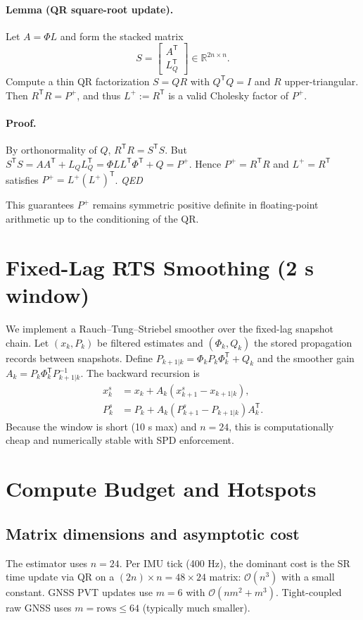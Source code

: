 \documentclass[10pt]{article}
\newcommand{\R}{\mathbb{R}}
\newcommand{\trans}{^{\mathsf T}}
\newcommand{\defeq}{\mathrel{:=}}
\begin{document}
\paragraph{Lemma (QR square-root update).}
Let $A=\Phi L$ and form the stacked matrix
\begin{equation}
  S = \begin{bmatrix} A\trans \\ L_Q\trans \end{bmatrix}\in \R^{2n\times n}.
\end{equation}
Compute a thin QR factorization $S = QR$ with $Q\trans Q = I$ and $R$ upper-triangular.
Then $R\trans R = P^+$, and thus $L^+ \defeq R\trans$ is a valid Cholesky factor of $P^+$.

\paragraph{Proof.}
By orthonormality of $Q$, $R\trans R = S\trans S$.
But $S\trans S = A A\trans + L_Q L_Q\trans = \Phi L L\trans \Phi\trans + Q = P^+$.
Hence $P^+ = R\trans R$ and $L^+=R\trans$ satisfies $P^+=L^+ (L^+)\trans$. \hfill\textit{QED}

This guarantees $P^+$ remains symmetric positive definite in floating-point arithmetic up to the conditioning of the QR.

\section{Fixed-Lag RTS Smoothing (2 s window)}
We implement a Rauch--Tung--Striebel smoother over the fixed-lag snapshot chain.
Let $(x_k,P_k)$ be filtered estimates and $(\Phi_k,Q_k)$ the stored propagation records between snapshots.
Define $P_{k+1|k}=\Phi_k P_k \Phi_k\trans + Q_k$ and the smoother gain
$A_k = P_k \Phi_k\trans P_{k+1|k}^{-1}$.
The backward recursion is
\begin{align}
  x^s_k &= x_k + A_k (x^s_{k+1} - x_{k+1|k}),\\
  P^s_k &= P_k + A_k (P^s_{k+1}-P_{k+1|k}) A_k\trans.
\end{align}
Because the window is short (10 s max) and $n=24$, this is computationally cheap and numerically stable with SPD enforcement.

\section{Compute Budget and Hotspots}
\subsection{Matrix dimensions and asymptotic cost}
The estimator uses $n=24$.
Per IMU tick (400 Hz), the dominant cost is the SR time update via QR on a $(2n)\times n = 48\times 24$ matrix:
$\mathcal{O}(n^3)$ with a small constant.
GNSS PVT updates use $m=6$ with $\mathcal{O}(n m^2 + m^3)$.
Tight-coupled raw GNSS uses $m=\text{rows}\le 64$ (typically much smaller).
\end{document}
